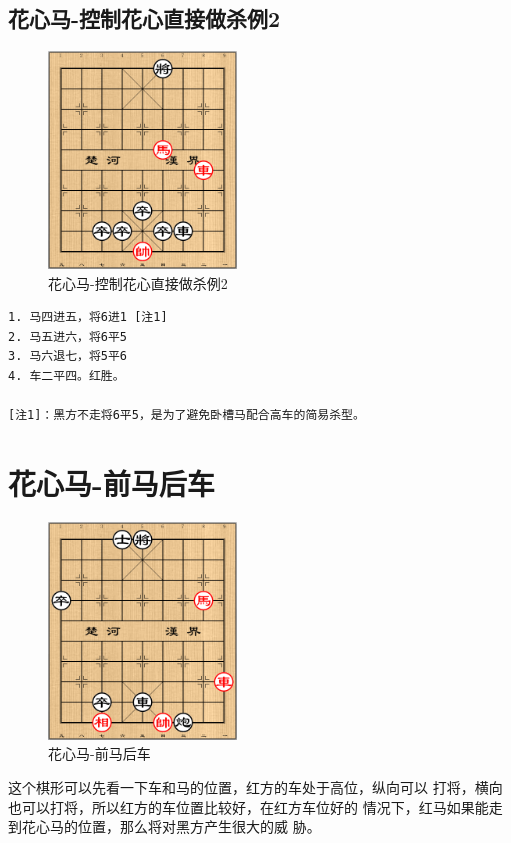 \documentclass[a5paper,twoside]{book}
\begin{document}
\subsection{花心马-控制花心直接做杀例2}
\label{sec-5-3-2}
\begin{figure}[H]
\centering
\includegraphics[width=5cm]{pic/花心马-控制花心直接做杀例2.png}
\caption{花心马-控制花心直接做杀例2}
\end{figure}

\begin{verbatim}
1. 马四进五，将6进1 [注1]
2. 马五进六，将6平5
3. 马六退七，将5平6
4. 车二平四。红胜。   
   
[注1]：黑方不走将6平5，是为了避免卧槽马配合高车的简易杀型。
\end{verbatim}


\section{花心马-前马后车}
\label{sec-5-4}
\begin{figure}[H]
\centering
\includegraphics[width=5cm]{pic/花心马-前马后车.png}
\caption{花心马-前马后车}
\end{figure}

这个棋形可以先看一下车和马的位置，红方的车处于高位，纵向可以
打将，横向也可以打将，所以红方的车位置比较好，在红方车位好的
情况下，红马如果能走到花心马的位置，那么将对黑方产生很大的威
胁。
\end{document}
